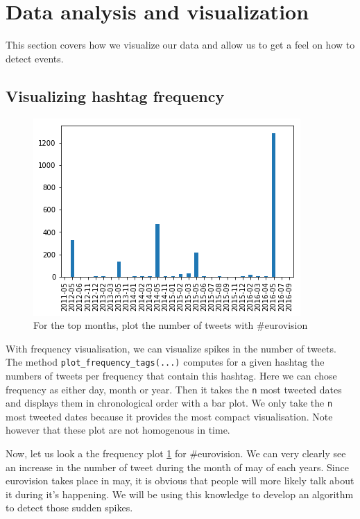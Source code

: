 \documentclass[11pt]{article}
\begin{document}
\section{Data analysis and visualization}

This section covers how we visualize our data and allow us to get a feel on how to detect events.

\subsection{Visualizing hashtag frequency}

\begin{figure}[htbp]
  \vspace*{-1mm}
  \centering
  \includegraphics[width=\columnwidth]{figures/freq_month_eurovision.png}
  \vspace{-5mm}
  \caption{For the top months, plot the number of tweets with  \#eurovision}
  \label{fig:freq_month_eurovision}
\end{figure}

With frequency visualisation, we can visualize spikes in the number of tweets. The method \texttt{plot\_frequency\_tags(...)} computes for a given hashtag the numbers of tweets per frequency that contain this hashtag. Here we can chose frequency as either day, month or year. Then it takes the \texttt{n} most tweeted dates and displays them in chronological order with a bar plot. We only take the \texttt{n} most tweeted dates because it provides the most compact visualisation. Note however that these plot are not homogenous in time. 

Now, let us look a the frequency plot \ref{fig:freq_month_eurovision} for \#eurovision.
We can very clearly see an increase in the number of tweet during the month of may of each years. Since eurovision takes place in may, it is obvious that people will more likely talk about it during it's happening. We will be using this knowledge to develop an algorithm to detect those sudden spikes.
\end{document}
